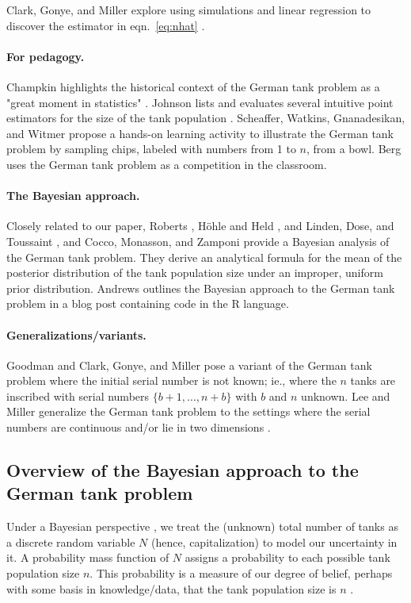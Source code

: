 \documentclass[11pt, oneside]{article}
\begin{document}
Clark, Gonye, and Miller explore using simulations and linear regression to discover the estimator in eqn.~\ref{eq:nhat} \cite{clark2021lessons}. 

\paragraph{For pedagogy.} Champkin highlights the historical context of the German tank problem as a "great moment in statistics" \cite{grajalez2013great}. 
Johnson lists and evaluates several intuitive point estimators for the size of the tank population \cite{johnson1994estimating}. 
Scheaffer, Watkins, Gnanadesikan, and Witmer \cite{scheaffer2013activity} propose a hands-on learning activity to illustrate the German tank problem by sampling chips, labeled with numbers from 1 to $n$, from a bowl. 
Berg \cite{berg2021bayesian} uses the German tank problem as a competition in the classroom.  

\paragraph{The Bayesian approach.}
Closely related to our paper, Roberts \cite{roberts1967informative}, H{\"o}hle and Held \cite{hohle2006bayesian}, and Linden, Dose, and Toussaint \cite{von2014bayesian}, and Cocco, Monasson, and Zamponi \cite{cocco2022statistical} provide a Bayesian analysis of the German tank problem. They derive an analytical formula for the mean of the posterior distribution of the tank population size under an improper, uniform prior distribution. Andrews \cite{blogpost} outlines the Bayesian approach to the German tank problem in a blog post containing code in the R language.

\paragraph{Generalizations/variants.}
Goodman \cite{goodman1952serial,goodman1954some} and Clark, Gonye, and Miller \cite{clark2021lessons} pose a variant of the German tank problem where the initial serial number is not known; ie., where the $n$ tanks are inscribed with serial numbers $\{b+1, ..., n+b\}$ with $b$ and $n$ unknown. 
Lee and Miller generalize the German tank problem to the settings where the serial numbers are continuous and/or lie in two dimensions \cite{lee2022generalizing}. 

\subsection{Overview of the Bayesian approach to the German tank problem}
Under a Bayesian perspective \cite{bolstad2016introduction,downey2021think,van2021bayesian}, we treat the (unknown) total number of tanks as a discrete random variable $N$ (hence, capitalization) to model our uncertainty in it. A probability mass function of $N$ assigns a probability to each possible tank population size $n$. This probability is a measure of our degree of belief, perhaps with some basis in knowledge/data, that the tank population size is $n$ \cite{ghosh2006introduction}. 
\end{document}
